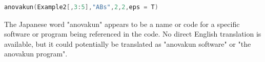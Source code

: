 \begin{lstlisting}[language=c++,label={code:23_12},caption={Executed with anovakun}]
anovakun(Example2[,3:5],"ABs",2,2,eps = T)
\end{lstlisting}

The Japanese word "anovakun" appears to be a name or code for a specific software or program being referenced in the code. No direct English translation is available, but it could potentially be translated as "anovakun software" or "the anovakun program".

